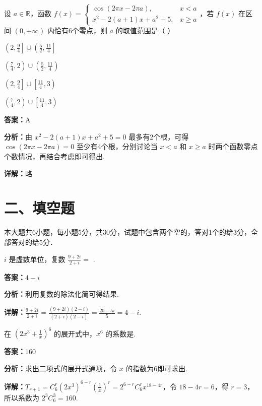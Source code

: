 \begin{question}[points=5]
设 $a \in \mathbb{R}$，函数 $f(x) = \begin{cases} \cos(2\pi x - 2\pi a), & x < a \\ x^2 - 2(a+1)x + a^2 + 5, & x \ge a \end{cases}$，若 $f(x)$ 在区间 $(0, +\infty)$ 内恰有6个零点，则 $a$ 的取值范围是（   ）
\begin{choices}
  \item $\left(2, \frac{9}{4}\right] \cup \left(\frac{5}{2}, \frac{11}{4}\right]$
  \item $\left(\frac{7}{4}, 2\right) \cup \left(\frac{5}{2}, \frac{11}{4}\right)$
  \item $\left(2, \frac{9}{4}\right] \cup \left[\frac{11}{4}, 3\right)$
  \item $\left(\frac{7}{4}, 2\right) \cup \left[\frac{11}{4}, 3\right)$
\end{choices}
\begin{solution}
\textbf{答案：}A

\textbf{分析：}由 $x^2 - 2(a+1)x + a^2 + 5 = 0$ 最多有2个根，可得 $\cos(2\pi x - 2\pi a)=0$ 至少有4个根，分别讨论当 $x < a$ 和 $x \ge a$ 时两个函数零点个数情况，再结合考虑即可得出.

\textbf{详解：}略
\end{solution}
\end{question}

\section*{二、填空题}
本大题共6小题，每小题5分，共30分，试题中包含两个空的，答对1个的给3分，全部答对的给5分．

\begin{question}[points=5]
$i$ 是虚数单位，复数 $\frac{9+2i}{2+i} =$ .
\fillin[{$4-i$}]
\begin{solution}
\textbf{答案：}$4-i$

\textbf{分析：}利用复数的除法化简可得结果.

\textbf{详解：}$\frac{9+2i}{2+i} = \frac{(9+2i)(2-i)}{(2+i)(2-i)} = \frac{20-5i}{5} = 4-i$.
\end{solution}
\end{question}

\begin{question}[points=5]
在 $\left(2x^3 + \frac{1}{x}\right)^6$ 的展开式中，$x^6$ 的系数是.
\fillin[{$160$}]
\begin{solution}
\textbf{答案：}$160$

\textbf{分析：}求出二项式的展开式通项，令 $x$ 的指数为6即可求出.

\textbf{详解：}$T_{r+1} = C_6^r (2x^3)^{6-r} \left(\frac{1}{x}\right)^r = 2^{6-r} C_6^r x^{18-4r}$，令 $18-4r=6$，得 $r=3$，所以系数为 $2^3 C_6^3 = 160$.
\end{solution}
\end{question}

